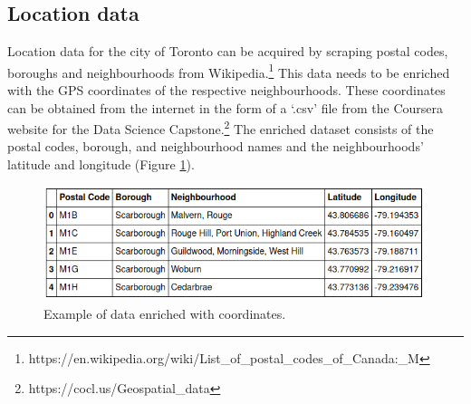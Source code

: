 \documentclass{article}
\begin{document}
\subsection{Location data}
Location data for the city of Toronto can be acquired by scraping postal codes, boroughs and neighbourhoods from Wikipedia.\footnote{https://en.wikipedia.org/wiki/List\_of\_postal\_codes\_of\_Canada:\_M} This data needs to be  enriched with the GPS coordinates of the respective neighbourhoods. These coordinates can be obtained from the internet in the form of a `.csv' file from the Coursera website for the Data Science Capstone.\footnote{https://cocl.us/Geospatial\_data} The enriched dataset consists of the postal codes, borough, and neighbourhood names and the neighbourhoods' latitude and longitude (Figure \ref{fig:enriched}).

\begin{figure}[ht]
 \includegraphics[width=\textwidth]{pics/enriched.png}
 \caption{Example of data enriched with coordinates.}
 \label{fig:enriched}
\end{figure}
\end{document}
